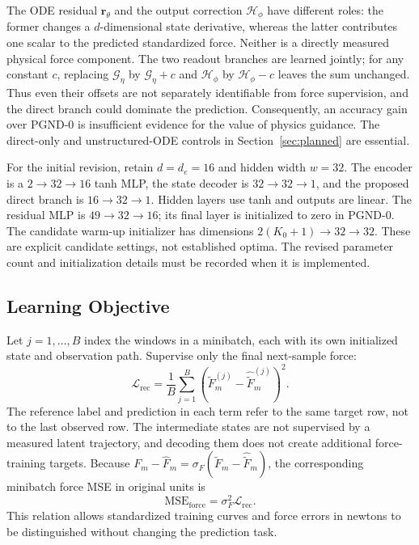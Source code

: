 \documentclass[journal,twoside]{IEEEtran}
\begin{document}
The ODE residual $\mathbf r_\theta$ and the output correction
$\mathcal H_\phi$ have different roles: the former changes a
$d$-dimensional state derivative, whereas the latter contributes one
scalar to the predicted standardized force. Neither is a directly measured
physical force component. The two readout branches are learned jointly;
for any constant $c$, replacing $\mathcal G_\eta$ by
$\mathcal G_\eta+c$ and $\mathcal H_\phi$ by
$\mathcal H_\phi-c$ leaves the sum unchanged. Thus even their offsets are
not separately identifiable from force supervision, and the direct branch
could dominate the prediction.
Consequently, an accuracy gain over PGND-0 is insufficient evidence for the
value of physics guidance. The direct-only and unstructured-ODE controls
in Section~\ref{sec:planned} are essential.

For the initial revision, retain $d=d_e=16$ and hidden width $w=32$. The encoder
is a $2\!\to\!32\!\to\!16$ tanh MLP, the state decoder is
$32\!\to\!32\!\to\!1$, and the proposed direct branch is
$16\!\to\!32\!\to\!1$. Hidden layers use tanh and outputs are linear.
The residual MLP is $49\!\to\!32\!\to\!16$; its final layer is initialized
to zero in PGND-0. The candidate warm-up initializer has dimensions
$2(K_0+1)\!\to\!32\!\to\!32$. These are explicit candidate settings,
not established optima. The revised parameter count and initialization
details must be recorded when it is implemented.

\subsection{Learning Objective}
\label{subsec:objective}
Let $j=1,\ldots,B$ index the windows in a minibatch, each with its own
initialized state and observation path. Supervise only the final
next-sample force:
\begin{equation}
    \mathcal L_{\mathrm{rec}}=\frac1B\sum_{j=1}^{B}
    (\tilde F^{(j)}_m-\hat{\tilde F}^{(j)}_m)^2.
    \label{eq:reconstruction_loss}
\end{equation}
The reference label and prediction in each term refer to the same target
row, not to the last observed row. The intermediate states are not
supervised by a measured latent trajectory, and decoding them does not
create additional force-training targets. Because
$F_m-\hat F_m=\sigma_F(\tilde F_m-\hat{\tilde F}_m)$, the corresponding
minibatch force MSE in original units is
\begin{equation}
    \mathrm{MSE}_{\mathrm{force}}=\sigma_F^2\mathcal L_{\mathrm{rec}}.
    \label{eq:loss_units}
\end{equation}
This relation allows standardized training curves and force errors in
newtons to be distinguished without changing the prediction task.
\end{document}

